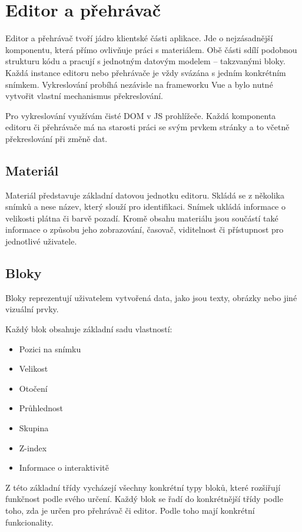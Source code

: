 \section{Editor a přehrávač}\label{text:realizace/editor}

Editor a přehrávač tvoří jádro klientské části aplikace. 
Jde o nejzásadnější komponentu, která přímo ovlivňuje práci s materiálem. 
Obě části sdílí podobnou strukturu kódu a pracují s jednotným datovým modelem -- takzvanými bloky. 
Každá instance editoru nebo přehrávače je vždy svázána s jedním konkrétním snímkem. 
Vykreslování probíhá nezávisle na frameworku Vue a bylo nutné vytvořit vlastní mechanismus překreslování.

Pro vykreslování využívám čisté DOM v JS prohlížeče.
Každá komponenta editoru či přehrávače má na starosti práci se svým prvkem stránky a to včetně překreslování při změně dat.

\subsection{Materiál}

Materiál představuje základní datovou jednotku editoru.
Skládá se z několika snímků a nese název, který slouží pro identifikaci. 
Snímek ukládá informace o velikosti plátna či barvě pozadí.
Kromě obsahu materiálu jsou součástí také informace o způsobu jeho zobrazování, časovač, viditelnost či přístupnost pro jednotlivé uživatele.

\subsection{Bloky}

Bloky reprezentují uživatelem vytvořená data, jako jsou texty, obrázky nebo jiné vizuální prvky. 

Každý blok obsahuje základní sadu vlastností: 

\begin{itemize}
	\item Pozici na snímku
	\item Velikost
	\item Otočení
	\item Průhlednost
	\item Skupina
	\item Z-index
	\item Informace o interaktivitě
\end{itemize}

Z této základní třídy vycházejí všechny konkrétní typy bloků, které rozšiřují funkčnost podle svého určení.
Každý blok se řadí do konkrétnější třídy podle toho, zda je určen pro přehrávač či editor.
Podle toho mají konkrétní funkcionality.

